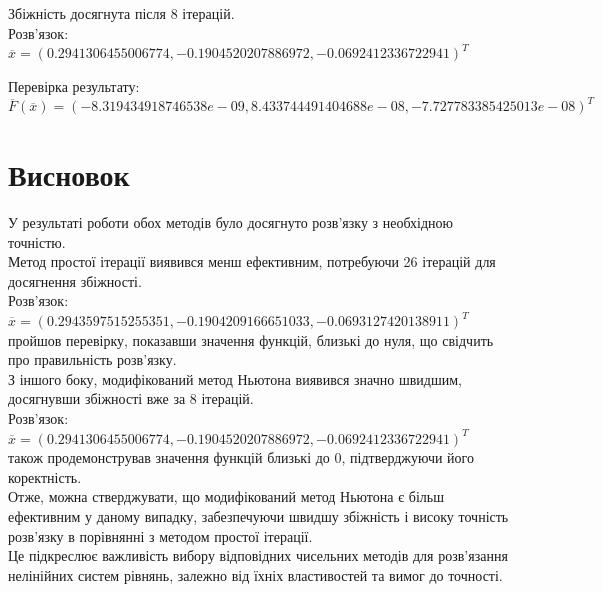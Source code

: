 \documentclass[a4paper, 12pt]{article}
\begin{document}
Збіжність досягнута після 8 ітерацій. \\
Розв'язок: 
\( \overline x = ( 0.2941306455006774, -0.1904520207886972, -0.0692412336722941)^T \)

Перевірка результату: \\
\(\overline F(\overline{x}) = (-8.319434918746538e-09, 8.433744491404688e-08, -7.727783385425013e-08)^T \)

\newpage
\section{Висновок}

У результаті роботи обох методів було досягнуто розв'язку з необхідною точністю. \\ 

Метод простої ітерації виявився менш ефективним, потребуючи 26 ітерацій для досягнення збіжності. \\ 
Розв'язок: \( \overline x = ( 0.2943597515255351, -0.1904209166651033, -0.0693127420138911 )^T \)
 пройшов перевірку, показавши значення функцій, близькі до нуля, що свідчить про правильність розв'язку. \\ 

З іншого боку, модифікований метод Ньютона виявився значно швидшим, досягнувши збіжності вже за 8 ітерацій. \\ 
Розв'язок: \( \overline x = ( 0.2941306455006774, -0.1904520207886972, -0.0692412336722941)^T \) \\
 також продемонстрував значення функцій близькі до 0, підтверджуючи його коректність. \\ 

Отже, можна стверджувати, що модифікований метод Ньютона є більш ефективним у даному випадку, забезпечуючи швидшу збіжність і високу точність розв'язку в порівнянні з методом простої ітерації. \\ 

Це підкреслює важливість вибору відповідних чисельних методів для розв'язання нелінійних систем рівнянь, залежно від їхніх властивостей та вимог до точності.
\end{document}
